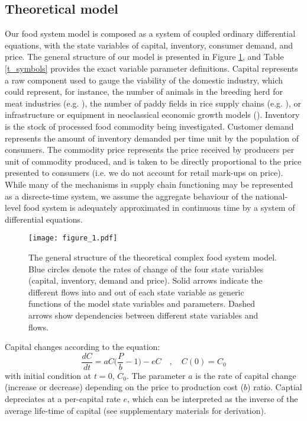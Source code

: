 \documentclass[12pt]{article}
\begin{document}
\subsection{Theoretical model}
Our food system model is composed as a system of coupled ordinary differential equations, with the state variables of capital, inventory, consumer demand, and price. The general structure of our model is presented in Figure \ref{fig_cfs}, and Table \ref{t_symbols} provides the exact variable parameter definitions. Capital represents a raw component used to gauge the viability of the domestic industry, which could represent, for instance, the number of animals in the breeding herd for meat industries (e.g. \cite{meadows1971}), the number of paddy fields in rice supply chains (e.g. \cite{chung2018}), or infrastructure or equipment in neoclassical economic growth models (\cite{ngonghala2017}). Inventory is the stock of processed food commodity being investigated. Customer demand represents the amount of inventory demanded per time unit by the population of consumers. The commodity price represents the price received by producers per unit of commodity produced, and is taken to be directly proportional to the price presented to consumers (i.e. we do not account for retail mark-ups on price). While many of the mechanisms in supply chain functioning may be represented as a disrecte-time system, we assume the aggregate behaviour of the national-level food system is adequately approximated in continuous time by a system of differential equations.

\begin{figure}[t!]
  \centering
  \texttt{[image: figure\_1.pdf]}
  \caption{The general structure of the theoretical complex food system model. Blue circles denote the rates of change of the four state variables (capital, inventory, demand and price). Solid arrows indicate the different flows into and out of each state variable as generic functions of the model state variables and parameters. Dashed arrows show dependencies between different state variables and flows.}
  \label{fig_cfs}
\end{figure}

Capital changes according to the equation:
%
\begin{equation}
  \frac{dC}{dt} = a C \Big(\frac{P}{b} - 1\Big) - e C \quad, \quad C(0) = C_0
  \label{eq_capital}
\end{equation}
%
with initial condition at $t = 0$, $C_0$. The parameter $a$ is the rate of capital change (increase or decrease) depending on the price to production cost ($b$) ratio. Captial depreciates at a per-capital rate $e$, which can be interpreted as the inverse of the average life-time of capital (see supplementary materials for derivation).
\end{document}
